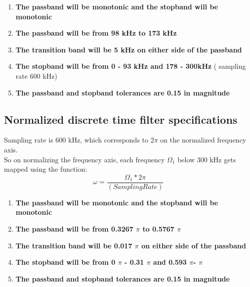\documentclass[12pt]{article}
\begin{document}
    \begin{enumerate}
    \item \textbf{The passband will be monotonic and the stopband will be monotonic}
    \item \textbf{The passband will be from 98 kHz to 173 kHz}
    \item \textbf{The transition band will be 5 kHz on either side of the passband}
    \item \textbf{The stopband will be from 0 - 93 kHz and 178 - 300kHz} ( sampling rate 600 kHz)
    \item \textbf{The passband and stopband tolerances are 0.15 in magnitude}

\end{enumerate}
\subsection{Normalized discrete time filter specifications}
Sampling rate is 600 kHz, which corresponds to 2$\pi$ on the normalized frequency axis.
\\So on normalizing the frequency axis, each frequency $\Omega_1$ below 300 kHz gets mapped using the function:
\begin{equation}
    \omega=\frac{\Omega_1 * 2 \pi}{(Sampling Rate)}
\end{equation}
\begin{enumerate}
    \item \textbf{The passband will be monotonic and the stopband will be monotonic}
    \item \textbf{The passband will be from 0.3267 $\pi$ to 0.5767 $\pi$}
    \item \textbf{The transition band will be 0.017 $\pi$ on either side of the passband}
    \item \textbf{The stopband will be from 0 $\pi$ - 0.31 $\pi$ and 0.593 $\pi$- $\pi$}
    \item \textbf{The passband and stopband tolerances are 0.15 in magnitude}

\end{enumerate}
\newpage
\end{document}

